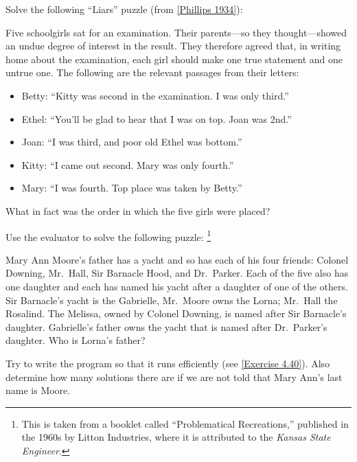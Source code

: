\begin{exercise}
	\label{Exercise 4.42}
	Solve the following “Liars” puzzle (from \cref{Phillips 1934}):

	Five schoolgirls sat for an examination.
	Their parents---so they thought---showed an undue degree of interest in the result.
	They therefore agreed that, in writing home about the examination, each girl should make one true statement and one untrue one.
	The following are the relevant passages from their letters:
	\begin{itemize}

		\item
			Betty:
			“Kitty was second in the examination.
			I was only third.”

		\item
			Ethel:
			“You'll be glad to hear that I was on top.
			Joan was 2nd.”

		\item
			Joan:
			“I was third, and poor old Ethel was bottom.”

		\item
			Kitty:
			“I came out second.
			Mary was only fourth.”

		\item
			Mary:
			“I was fourth.
			Top place was taken by Betty.”

	\end{itemize}
	What in fact was the order in which the five girls were placed?
\end{exercise}



\begin{exercise}
	\label{Exercise 4.43}
	Use the  evaluator to solve the following puzzle:%
	\footnote{
		This is taken from a booklet called “Problematical Recreations,” published in the 1960s by Litton Industries, where it is attributed to the \textit{Kansas State Engineer}.
	}

	Mary Ann Moore’s father has a yacht and so has each of his four friends:
	Colonel Downing, Mr.~Hall, Sir Barnacle Hood, and Dr.~Parker.
	Each of the five also has one daughter and each has named his yacht after a daughter of one of the others.
	Sir Barnacle’s yacht is the Gabrielle, Mr.~Moore owns the Lorna;
	Mr.~Hall the Rosalind.
	The Melissa, owned by Colonel Downing, is named after Sir Barnacle’s daughter.
	Gabrielle’s father owns the yacht that is named after Dr.~Parker’s daughter.
	Who is Lorna’s father?

	Try to write the program so that it runs efficiently (see \cref{Exercise 4.40}).
	Also determine how many solutions there are if we are not told that Mary Ann’s last name is Moore.
\end{exercise}



